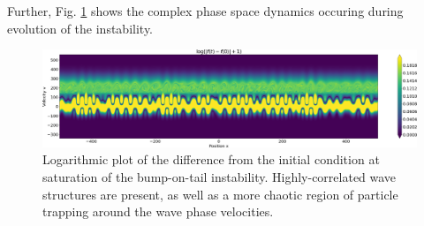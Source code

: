 \documentclass{article}
\begin{document}
Further, Fig. \ref{tapestry} shows the complex phase space dynamics occuring during evolution of the instability.
\begin{figure}[b]
  \centering
  \includegraphics[width=\textwidth]{tapestry}
  \caption{Logarithmic plot of the difference from the initial condition at saturation of the bump-on-tail instability. Highly-correlated wave structures are present, as well as a more chaotic region of particle trapping around the wave phase velocities.}\label{tapestry}
\end{figure}




\end{document}
